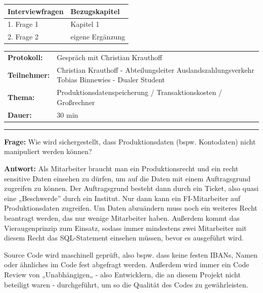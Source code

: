 
\label{Anhang 1 - Interviewleitfaden für das Interview mit Christian Krauthoff}

\begin{tabular}{|p{10cm}|p{4cm}|}
    \hline
    \textbf{Interviewfragen} & \textbf{Bezugskapitel} \\
    \hline
    1. Frage 1 & Kapitel 1 \\
    \hline
    2. Frage 2 & eigene Ergänzung \\
    \hline
    \end{tabular}

\newpage

\label{appendix: Anhang 3}

\begin{tabular}{p{2.5 cm}p{11.8 cm}}
\textbf{Protokoll:} & Gespräch mit Christian Krauthoff \\
\textbf{Teilnehmer:} & Christian Krauthoff - Abteilungsleiter Auslandszahlungsverkehr \break Tobias Binnewies - Dualer Student \\
\textbf{Thema:} & Produktionsdatenspeicherung / Transaktionskosten / Großrechner \\
\textbf{Dauer:} & 30 min
\end{tabular}
\bigbreak
\noindent\rule[1ex]{\textwidth}{1pt} %
\bigbreak

\textbf{Frage:} 
Wie wird sichergestellt, dass Produktionsdaten (bspw. Kontodaten) nicht manipuliert werden können?


\textbf{Antwort:} 
Als Mitarbeiter braucht man ein Produktionsrecht und ein recht sensitive Daten einsehen zu dürfen, um auf die Daten mit einem Auftragsgrund zugreifen zu können. Der Auftragsgrund besteht dann durch ein Ticket, also quasi eine „Beschwerde” durch ein Institut.
Nur dann kann ein FI-Mitarbeiter auf Produktionsdaten zugreifen.
Um Daten abzuändern muss noch ein weiteres Recht beantragt werden, das nur wenige Mitarbeiter haben.
Außerdem kommt das Vieraugenprinzip zum Einsatz, sodass immer mindestens zwei Mitarbeiter mit diesem Recht das SQL-Statement einsehen müssen, bevor es ausgeführt wird.

Source Code wird maschinell geprüft, also bspw. dass keine festen IBANs, Namen oder ähnliches im Code fest abgefragt werden.
Außerdem wird immer ein Code Review von „Unabhängigen„ - also Entwicklern, die an diesem Projekt nicht beteiligt waren - durchgeführt, um so die Qualität des Codes zu gewährleisten.

